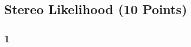 \newif\ifvimbug
\vimbugfalse

\ifvimbug

\fi


\subsection{Stereo Likelihood (10 Points)}
\subsubsection{1}
